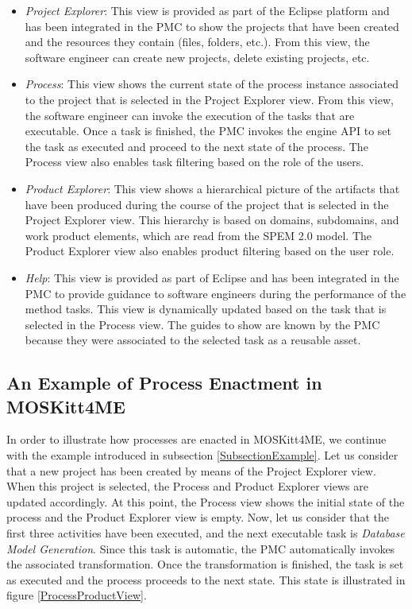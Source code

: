 \documentclass[runningheads,a4paper]{llncs}
\begin{document}
\begin{itemize}
  \item \textit{Project Explorer}: This view is provided as
  part of the Eclipse platform and has been integrated in the PMC to show the
  projects that have been created and the resources they contain (files,
  folders, etc.). From this view, the software engineer can create new projects,
  delete existing projects, etc.
  
  \item \textit{Process}: This view shows the current state of the
  process instance associated to the project that is selected in the Project
  Explorer view. From this view, the software engineer can invoke the execution
  of the tasks that are executable. Once a task is finished, the PMC invokes the
  engine API to set the task as executed and proceed to the next state of the
  process. The Process view also enables task filtering based on the role of the
  users.
  
  \item \textit{Product Explorer}: This view shows a hierarchical picture of the
  artifacts that have been produced during the course of the project that is
  selected in the Project Explorer view. This hierarchy is based on domains,
  subdomains, and work product elements, which are read from the SPEM 2.0 model.
  The Product Explorer view also enables product filtering based on the user
  role.
  
  \item \textit{Help}: This view is provided as part of Eclipse and has been
  integrated in the PMC to provide guidance to software engineers during
  the performance of the method tasks. This view is dynamically updated based on
  the task that is selected in the Process view. The guides to show are known by
  the PMC because they were associated to the selected task as a reusable asset.
\end{itemize}

\subsection{An Example of Process Enactment in MOSKitt4ME}
\label{SubsectionExample2}

In order to illustrate how processes are enacted in MOSKitt4ME, we continue with
the example introduced in subsection \ref{SubsectionExample}. Let us consider
that a new project has been created by means of the Project Explorer view. When
this project is selected, the Process and Product Explorer views are updated
accordingly. At this point, the Process view shows the initial state of the
process and the Product Explorer view is empty. Now, let us consider that the
first three activities have been executed, and the next executable task is
\textit{Database Model Generation}. Since this task is automatic, the PMC
automatically invokes the associated transformation. Once the transformation is
finished, the task is set as executed and the process proceeds to the next
state. This state is illustrated in figure \ref{ProcessProductView}.
\end{document}

